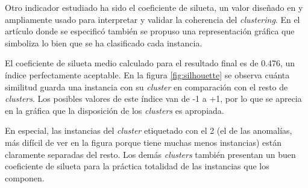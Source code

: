 Otro indicador estudiado ha sido el coeficiente de silueta, un valor diseñado en \cite{Rousseeuw_1987} y ampliamente usado para interpretar y validar la coherencia del \emph{clustering}.
En el artículo donde se especificó también se propuso una representación gráfica que simboliza lo bien que se ha clasificado cada instancia.

El coeficiente de silueta medio calculado para el resultado final es de 0.476, un índice perfectamente aceptable.
En la figura \ref{fig:silhouette} se observa cuánta similitud guarda una instancia con su \emph{cluster} en comparación con el resto de \emph{clusters}.
Los posibles valores de este índice van de -1 a +1, por lo que se aprecia en la gráfica que la disposición de los \emph{clusters} es apropiada.

En especial, las instancias del \emph{cluster} etiquetado con el 2 (el de las anomalías, más difícil de ver en la figura porque tiene muchas menos instancias) están claramente separadas del resto.
Los demás \emph{clusters} también presentan un buen coeficiente de silueta para la práctica totalidad de las instancias que los componen.

